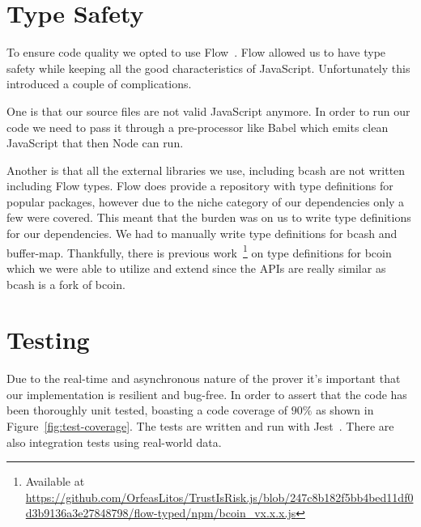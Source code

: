 \section{Type Safety}
To ensure code quality we opted to use Flow~\cite{flow}. Flow allowed us to have type safety while keeping all the good characteristics of JavaScript. Unfortunately this introduced a couple of complications.

One is that our source files are not valid JavaScript anymore. In order to run our code we need to pass it through a pre-processor like Babel which emits clean JavaScript that then Node can run.

Another is that all the external libraries we use, including bcash are not written including Flow types. Flow does provide a repository with type definitions for popular packages, however due to the niche category of our dependencies only a few were covered. This meant that the burden was on us to write type definitions for our dependencies. We had to manually write type definitions for bcash and buffer-map. Thankfully, there is previous work~\footnote{Available at \url{https://github.com/OrfeasLitos/TrustIsRisk.js/blob/247c8b182f5bb4bed11df0d3b9136a3e27848798/flow-typed/npm/bcoin_vx.x.x.js}} on type definitions for bcoin which we were able to utilize and extend since the APIs are really similar as bcash is a fork of bcoin.

\section{Testing}
Due to the real-time and asynchronous nature of the prover it's important that our implementation is resilient and bug-free. In order to assert that the code has been thoroughly unit tested, boasting a code coverage of $90\%$ as shown in Figure~\ref{fig:test-coverage}. The tests are written and run with Jest~\cite{jest}. There are also integration tests using real-world data.


